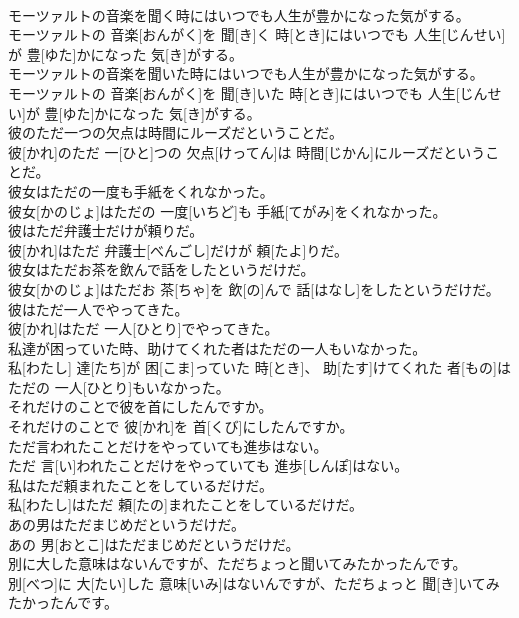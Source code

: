 \documentclass[8pt]{extreport}
\begin{document}
\begin{CJK}{UTF8}{min}
\\	モーツァルトの音楽を聞く時にはいつでも人生が豊かになった気がする。	
\\	モーツァルトの 音楽[おんがく]を 聞[き]く 時[とき]にはいつでも 人生[じんせい]が 豊[ゆた]かになった 気[き]がする。
\\	モーツァルトの音楽を聞いた時にはいつでも人生が豊かになった気がする。	
\\	モーツァルトの 音楽[おんがく]を 聞[き]いた 時[とき]にはいつでも 人生[じんせい]が 豊[ゆた]かになった 気[き]がする。
\\	彼のただ一つの欠点は時間にルーズだということだ。	
\\	彼[かれ]のただ 一[ひと]つの 欠点[けってん]は 時間[じかん]にルーズだということだ。
\\	彼女はただの一度も手紙をくれなかった。	
\\	彼女[かのじょ]はただの 一度[いちど]も 手紙[てがみ]をくれなかった。
\\	彼はただ弁護士だけが頼りだ。	
\\	彼[かれ]はただ 弁護士[べんごし]だけが 頼[たよ]りだ。
\\	彼女はただお茶を飲んで話をしたというだけだ。	
\\	彼女[かのじょ]はただお 茶[ちゃ]を 飲[の]んで 話[はなし]をしたというだけだ。
\\	彼はただ一人でやってきた。	
\\	彼[かれ]はただ 一人[ひとり]でやってきた。
\\	私達が困っていた時、助けてくれた者はただの一人もいなかった。	
\\	私[わたし] 達[たち]が 困[こま]っていた 時[とき]、 助[たす]けてくれた 者[もの]はただの 一人[ひとり]もいなかった。
\\	それだけのことで彼を首にしたんですか。	
\\	それだけのことで 彼[かれ]を 首[くび]にしたんですか。
\\	ただ言われたことだけをやっていても進歩はない。	
\\	ただ 言[い]われたことだけをやっていても 進歩[しんぽ]はない。
\\	私はただ頼まれたことをしているだけだ。	
\\	私[わたし]はただ 頼[たの]まれたことをしているだけだ。
\\	あの男はただまじめだというだけだ。	
\\	あの 男[おとこ]はただまじめだというだけだ。
\\	別に大した意味はないんですが、ただちょっと聞いてみたかったんです。	
\\	別[べつ]に 大[たい]した 意味[いみ]はないんですが、ただちょっと 聞[き]いてみたかったんです。

\end{CJK}
\end{document}
